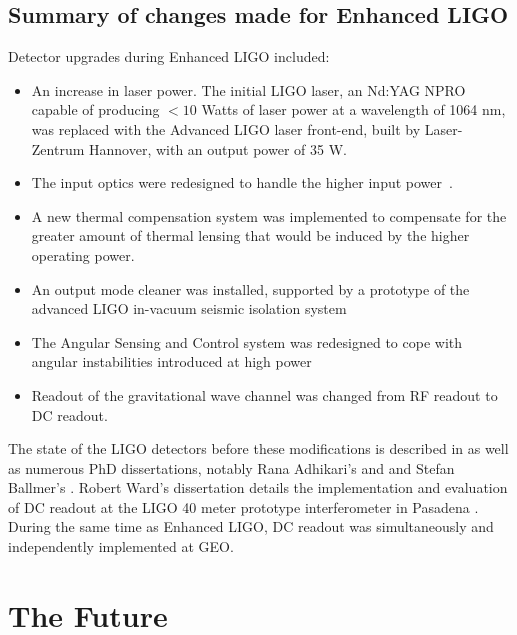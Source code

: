 \subsection{Summary of changes made for Enhanced LIGO}


Detector upgrades during Enhanced LIGO included:
\begin{itemize}
\item An increase in laser power.  The initial LIGO laser, an Nd:YAG
  NPRO capable of producing $< 10$ Watts of laser power at a
  wavelength of 1064 nm, was replaced with the Advanced LIGO laser
  front-end, built by Laser-Zentrum Hannover, with an output power of 35 W.
\item The input optics were redesigned to handle the higher input
  power~\cite{DooleyCharacterization,Quetschke2008ElectroOptic}.  
\item A new thermal compensation system was implemented to compensate
  for the greater amount of thermal lensing that would be induced by
  the higher operating power\cite{Ballmer2006LIGO,RupalThesis}.
\item An output mode cleaner was installed, supported by a prototype
  of the advanced LIGO in-vacuum seismic isolation system~\cite{KisselThesis}
\item The Angular Sensing and Control system was redesigned to cope
  with angular instabilities introduced at high
  power~\cite{Sidles2006Optical,DooleyAngular}
\item Readout of the gravitational wave channel was changed from RF
  readout to DC readout.
\end{itemize}

The state of the LIGO detectors before these modifications is
described in \cite{S5InstrumentPaper} as well as numerous PhD
dissertations, notably Rana Adhikari's \cite{RanaThesis} and and
Stefan Ballmer's \cite{Ballmer2006LIGO}.  Robert Ward's dissertation
details the implementation and evaluation of DC readout at the LIGO 40
meter prototype interferometer in Pasadena \cite{RobWardThesis}.
%
During the same time as Enhanced LIGO, DC readout was simultaneously
and independently implemented at GEO\cite{GeoDC,Degallaix2010Commissioning}.

\section{The Future}

